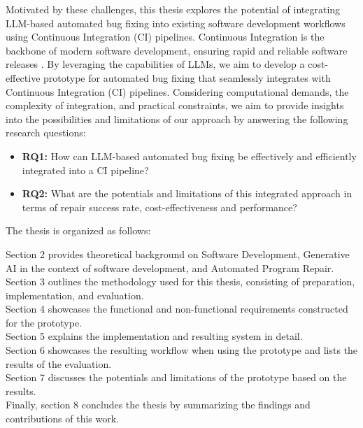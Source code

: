 Motivated by these challenges, this thesis explores the potential of integrating LLM-based automated bug fixing into existing software development workflows using Continuous Integration (CI) pipelines. Continuous Integration is the backbone of modern software development, ensuring rapid and reliable software releases \cite{ugwuezeContinuousIntegrationDeployment2024}. By leveraging the capabilities of LLMs, we aim to develop a cost-effective prototype for automated bug fixing that seamlessly integrates with Continuous Integration (CI) pipelines. Considering computational demands, the complexity of integration, and practical constraints, we aim to provide insights into the possibilities and limitations of our approach by answering the following research questions:

\begin{itemize}
    \item \textbf{RQ1:} How can LLM-based automated bug fixing be effectively and efficiently integrated into a CI pipeline?
    \item \textbf{RQ2:} What are the potentials and limitations of this integrated approach in terms of repair success rate, cost-effectiveness and performance?
\end{itemize}

The thesis is organized as follows:

Section 2 provides theoretical background on Software Development, Generative AI in the context of software development, and Automated Program Repair.\\
Section 3 outlines the methodology used for this thesis, consisting of preparation, implementation, and evaluation.\\
Section 4 showcases the functional and non-functional requirements constructed for the prototype.\\
Section 5 explains the implementation and resulting system in detail.\\
Section 6 showcases the resulting workflow when using the prototype and lists the results of the evaluation.\\
Section 7 discusses the potentials and limitations of the prototype based on the results.\\
Finally, section 8 concludes the thesis by summarizing the findings and contributions of this work.
